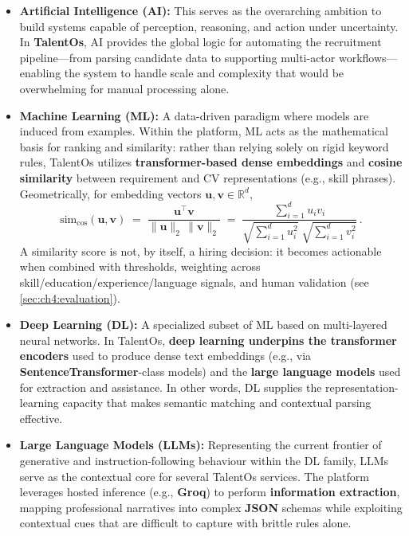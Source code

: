 \begin{itemize}
    \item \textbf{Artificial Intelligence (AI):} This serves as the overarching ambition to build systems capable of perception, reasoning, and action under uncertainty. In \textbf{TalentOs}, AI provides the global logic for automating the recruitment pipeline—from parsing candidate data to supporting multi-actor workflows—enabling the system to handle scale and complexity that would be overwhelming for manual processing alone.

    \item \textbf{Machine Learning (ML):} A data-driven paradigm where models are induced from examples. Within the platform, ML acts as the mathematical basis for ranking and similarity: rather than relying solely on rigid keyword rules, TalentOs utilizes \textbf{transformer-based dense embeddings} and \textbf{cosine similarity} between requirement and CV representations (e.g., skill phrases). Geometrically, for embedding vectors $\mathbf{u}, \mathbf{v} \in \mathbb{R}^{d}$,
    \begin{equation}
        \mathrm{sim}_{\cos}(\mathbf{u}, \mathbf{v}) \;=\;
        \frac{\mathbf{u}^{\top}\mathbf{v}}{\lVert \mathbf{u}\rVert_{2}\,\lVert \mathbf{v}\rVert_{2}}
        \;=\;
        \frac{\sum_{i=1}^{d} u_i v_i}{\sqrt{\sum_{i=1}^{d} u_i^{2}}\;\sqrt{\sum_{i=1}^{d} v_i^{2}}}\,.
        \label{eq:ch4:cosine}
    \end{equation}
    A similarity score is not, by itself, a hiring decision: it becomes actionable when combined with thresholds, weighting across skill/education/experience/language signals, and human validation (see \autoref{sec:ch4:evaluation}).

    \item \textbf{Deep Learning (DL):} A specialized subset of ML based on multi-layered neural networks. In TalentOs, \textbf{deep learning underpins the transformer encoders} used to produce dense text embeddings (e.g., via \textbf{SentenceTransformer}-class models) and the \textbf{large language models} used for extraction and assistance. In other words, DL supplies the representation-learning capacity that makes semantic matching and contextual parsing effective.

    \item \textbf{Large Language Models (LLMs):} Representing the current frontier of generative and instruction-following behaviour within the DL family, LLMs serve as the contextual core for several TalentOs services. The platform leverages hosted inference (e.g., \textbf{Groq}) to perform \textbf{information extraction}, mapping professional narratives into complex \textbf{JSON} schemas while exploiting contextual cues that are difficult to capture with brittle rules alone.
\end{itemize}

